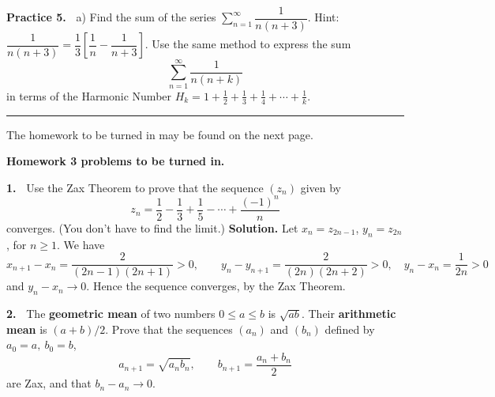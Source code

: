 \documentclass[12pt]{article}
\theoremstyle{definition}
\theoremstyle{remark}
\theoremstyle{definition}
\newenvironment{Solution}{\noindent\textbf{Solution.}}{}
\begin{document}
{\bf Practice 5.\ } a) Find the sum of the  series
$\sum\limits_{n=1}^\infty\dfrac{1}{n(n+3)}$. 
Hint:$ \dfrac{1}{n(n+3)}=\dfrac{1}{3}\left[\dfrac{1}{n}-\dfrac{1}{n+3}\right]$.
Use the same method to express the sum 
\[\sum_{n=1}^\infty\frac{1}{n(n+k)}\]
in terms of the Harmonic Number $H_k=1+\frac{1}{2}+\frac{1}{3}+\frac{1}{4}+\cdots+\frac{1}{k}$. 


 \rule{\textwidth}{1pt}
The homework to be turned in may be found on the next page.


\newpage

{\bf Homework 3 problems to be turned in.}

{\bf 1.\ } Use the Zax Theorem to prove that the sequence $(z_n)$ given by 
\[z_n=\frac{1}{2}-\frac{1}{3}+\frac{1}{5}-\cdots+\frac{(-1)^n}{n}
\] 
converges. (You don't have to find the limit.) 
\begin{Solution} Let $x_n=z_{2n-1}$, $y_n=z_{2n}$, for $n\geq 1$. We have 
\[x_{n+1}-x_n=\frac{2}{(2n-1)(2n+1)}>0,\qquad y_{n}-y_{n+1}=\frac{2}{(2n)(2n+2)}>0,
\quad y_n-x_n=\frac{1}{2n}>0 
\]
and $y_n-x_n\to 0$. Hence the sequence converges, by the Zax Theorem. 


\end{Solution}

{\bf 2.\ }  The  {\bf geometric mean} of two numbers $0\leq a\leq b$ is $\sqrt{ab}$. Their {\bf arithmetic mean} is $(a+b)/2$.
Prove that the sequences $(a_n)$ and $(b_n)$ defined by $a_0=a,\ b_0=b$, 
\[a_{n+1}=\sqrt{a_nb_n},\qquad b_{n+1}=\frac{a_n+b_n}{2}\]
are Zax, and that $b_n-a_n\to 0$. 
\end{document}
